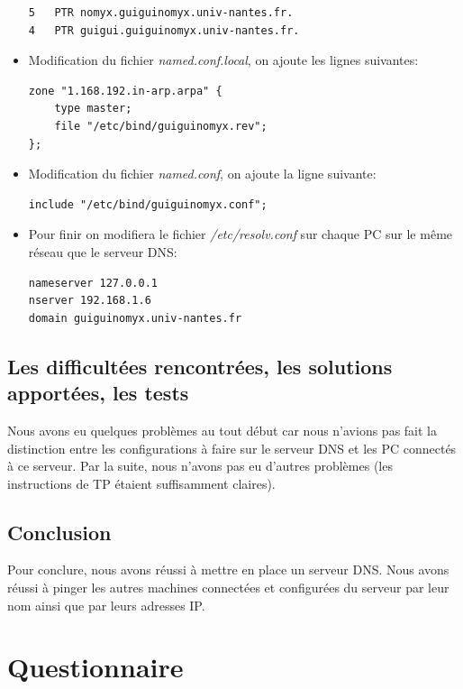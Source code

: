 \documentclass[a4paper,10pt]{article}
\begin{document}
\begin{itemize}
\begin{lstlisting}
5	PTR	nomyx.guiguinomyx.univ-nantes.fr.
4	PTR	guigui.guiguinomyx.univ-nantes.fr.
\end{lstlisting}
\item Modification du fichier \textit{named.conf.local}, on ajoute les lignes suivantes:
\begin{lstlisting}
zone "1.168.192.in-arp.arpa" {
	type master;
	file "/etc/bind/guiguinomyx.rev";
};
\end{lstlisting}
\item Modification du fichier \textit{named.conf}, on ajoute la ligne suivante:
\begin{lstlisting}
include "/etc/bind/guiguinomyx.conf";
\end{lstlisting}
\item Pour finir on modifiera le fichier \textit{/etc/resolv.conf} sur chaque PC sur le même réseau que le serveur DNS:
\begin{lstlisting}
nameserver 127.0.0.1
nserver 192.168.1.6
domain guiguinomyx.univ-nantes.fr
\end{lstlisting}
\end{itemize}

\subsection{Les difficultées rencontrées, les solutions apportées, les tests}
Nous avons eu quelques problèmes au tout début car nous n'avions pas fait la distinction entre les configurations à faire sur le serveur DNS et les PC connectés à ce serveur. Par la suite, nous n'avons pas eu d'autres problèmes (les instructions de TP étaient suffisamment claires).

\subsection{Conclusion}
Pour conclure, nous avons réussi à mettre en place un serveur DNS. Nous avons réussi à pinger les autres machines connectées et configurées du serveur par leur nom ainsi que par leurs adresses IP.

\newpage
\section{Questionnaire}
\end{document}
